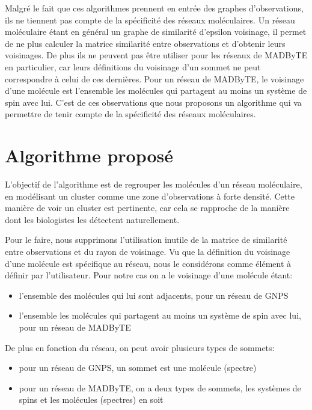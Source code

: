 \documentclass[12pt, french, latin.medieval, a4paper]{report}
\begin{document}
   	 Malgré le fait que ces algorithmes prennent en entrée des graphes d'observations, ils ne tiennent pas compte de la spécificité des réseaux moléculaires.
   	 Un réseau moléculaire étant en général un graphe de similarité d'epsilon voisinage, il permet de ne plus calculer la matrice similarité entre observations et d'obtenir leurs voisinages.
   	 De plus ils ne peuvent pas être utiliser pour les réseaux de MADByTE en particulier, car leurs définitions du voisinage
   	 d'un sommet ne peut correspondre à celui de ces dernières.
   	 Pour un réseau de MADByTE, le voisinage d'une molécule est l'ensemble les molécules qui partagent au moins un système de spin avec lui.
   	 C'est de ces observations que nous proposons un algorithme qui va permettre de tenir compte de la spécificité des réseaux moléculaires.

   	 \section{Algorithme proposé}
   	 
   	 L'objectif de l'algorithme est de regrouper les molécules d'un réseau moléculaire, en modélisant un cluster comme une zone d'observations à forte densité.
   	 Cette manière de voir un cluster est pertinente, car cela se rapproche de la manière dont les biologistes les détectent naturellement.

   	 Pour le faire, nous supprimons l'utilisation inutile de la matrice de similarité entre observations et du rayon de voisinage.
   	 Vu que la définition du voisinage d'une molécule est spécifique au réseau, nous le considérons comme élément à définir par l'utilisateur.
   	 Pour notre cas on a le voisinage d'une molécule étant:
   	 \begin{itemize}
   		 \item l'ensemble des molécules qui lui sont adjacents, pour un réseau de GNPS
   		 \item l'ensemble les molécules qui partagent au moins un système de spin avec lui, pour un réseau de MADByTE
   	 \end{itemize}
   	 De plus en fonction du réseau, on peut avoir plusieurs types de sommets:
   	 \begin{itemize}
   		 \item pour un réseau de GNPS, un sommet est une molécule (spectre)
   		 \item pour un réseau de MADByTE, on a deux types de sommets, les systèmes de spins et les molécules (spectres) en soit
   	 \end{itemize}
\end{document}
